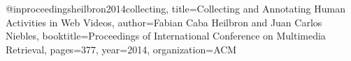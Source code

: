 @inproceedings{heilbron2014collecting,
  title={Collecting and Annotating Human Activities in Web Videos},
  author={Fabian Caba Heilbron and Juan Carlos Niebles},
  booktitle={Proceedings of International Conference on Multimedia Retrieval},
  pages={377},
  year={2014},
  organization={ACM}
}
